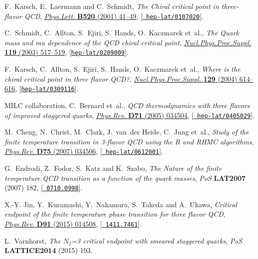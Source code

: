 \documentclass{PoS}
\begin{document}
\begin{thebibliography}{100}
F.~Karsch, E.~Laermann and C.~Schmidt, \emph{{The Chiral critical point in
  three-flavor QCD}},
  \href{http://dx.doi.org/10.1016/S0370-2693(01)01114-5}{\emph{Phys.Lett.} {\bf
  B520} (2001) 41--49}, [\href{https://arxiv.org/abs/hep-lat/0107020}{{\tt
  hep-lat/0107020}}].

C.~Schmidt, C.~Allton, S.~Ejiri, S.~Hands, O.~Kaczmarek et~al., \emph{{The
  Quark mass and mu dependence of the QCD chiral critical point}},
  \href{http://dx.doi.org/10.1016/S0920-5632(03)01601-3}{\emph{Nucl.Phys.Proc.Suppl.}
  {\bf 119} (2003) 517--519},
  [\href{https://arxiv.org/abs/hep-lat/0209009}{{\tt hep-lat/0209009}}].

F.~Karsch, C.~Allton, S.~Ejiri, S.~Hands, O.~Kaczmarek et~al., \emph{{Where is
  the chiral critical point in three flavor QCD?}},
  \href{http://dx.doi.org/10.1016/S0920-5632(03)02659-8}{\emph{Nucl.Phys.Proc.Suppl.}
  {\bf 129} (2004) 614--616},
  [\href{https://arxiv.org/abs/hep-lat/0309116}{{\tt hep-lat/0309116}}].

{\scshape MILC} collaboration, C.~Bernard et~al., \emph{{QCD thermodynamics
  with three flavors of improved staggered quarks}},
  \href{http://dx.doi.org/10.1103/PhysRevD.71.034504}{\emph{Phys.Rev.} {\bf
  D71} (2005) 034504}, [\href{https://arxiv.org/abs/hep-lat/0405029}{{\tt
  hep-lat/0405029}}].

M.~Cheng, N.~Christ, M.~Clark, J.~van~der Heide, C.~Jung et~al., \emph{{Study
  of the finite temperature transition in 3-flavor QCD using the R and RHMC
  algorithms}},
  \href{http://dx.doi.org/10.1103/PhysRevD.75.034506}{\emph{Phys.Rev.} {\bf
  D75} (2007) 034506}, [\href{https://arxiv.org/abs/hep-lat/0612001}{{\tt
  hep-lat/0612001}}].

G.~Endrodi, Z.~Fodor, S.~Katz and K.~Szabo, \emph{{The Nature of the finite
  temperature QCD transition as a function of the quark masses}}, {\emph{PoS}
  {\bf LAT2007} (2007) 182}, [\href{https://arxiv.org/abs/0710.0998}{{\tt
  0710.0998}}].

X.-Y. Jin, Y.~Kuramashi, Y.~Nakamura, S.~Takeda and A.~Ukawa, \emph{{Critical
  endpoint of the finite temperature phase transition for three flavor QCD}},
  \href{http://dx.doi.org/10.1103/PhysRevD.91.014508}{\emph{Phys.Rev.} {\bf
  D91} (2015) 014508}, [\href{https://arxiv.org/abs/1411.7461}{{\tt
  1411.7461}}].

L.~Varnhorst, \emph{{The $N_f$=3 critical endpoint with smeared staggered
  quarks}}, {\emph{PoS} {\bf LATTICE2014} (2015) 193}.


\end{thebibliography}
\end{document}
